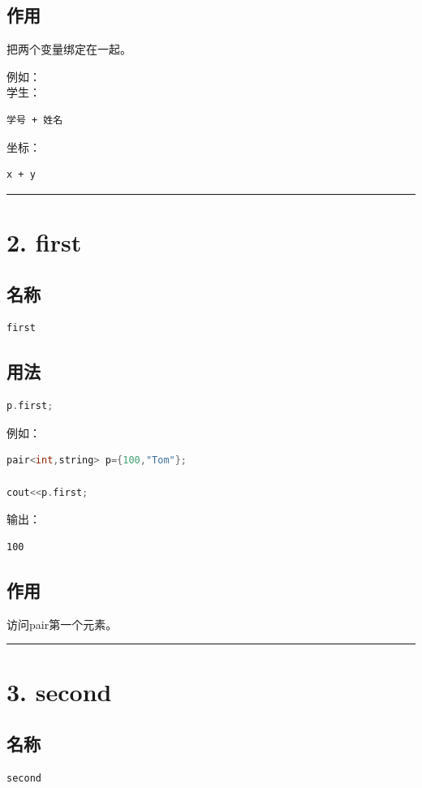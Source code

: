 \documentclass[10pt,twocolumn]{extarticle}
\begin{document}
\subsection{作用}
把两个变量绑定在一起。

例如：\\
学生：
\begin{lstlisting}
学号 + 姓名
\end{lstlisting}
坐标：
\begin{lstlisting}
x + y
\end{lstlisting}

\noindent\rule{\linewidth}{0.4pt}

\section{2. first}

\subsection{名称}
\begin{lstlisting}[language=C++]
first
\end{lstlisting}

\subsection{用法}
\begin{lstlisting}[language=C++]
p.first;
\end{lstlisting}
例如：
\begin{lstlisting}[language=C++]
pair<int,string> p={100,"Tom"};

cout<<p.first;
\end{lstlisting}
输出：
\begin{lstlisting}
100
\end{lstlisting}

\subsection{作用}
访问pair第一个元素。

\noindent\rule{\linewidth}{0.4pt}

\section{3. second}

\subsection{名称}
\begin{lstlisting}[language=C++]
second
\end{lstlisting}
\end{document}
